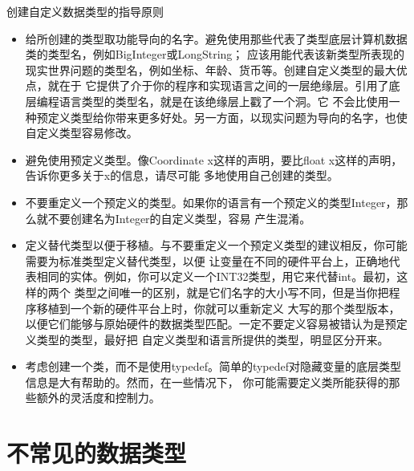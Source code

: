 \documentclass{article}
\begin{document}
\par
创建自定义数据类型的指导原则
\begin{itemize}
    \item 给所创建的类型取功能导向的名字。避免使用那些代表了类型底层计算机数据类的类型名，例如BigInteger或LongString；
    应该用能代表该新类型所表现的现实世界问题的类型名，例如坐标、年龄、货币等。创建自定义类型的最大优点，就在于
    它提供了介于你的程序和实现语言之间的一层绝缘层。引用了底层编程语言类型的类型名，就是在该绝缘层上戳了一个洞。它
    不会比使用一种预定义类型给你带来更多好处。另一方面，以现实问题为导向的名字，也使自定义类型容易修改。
    \item 避免使用预定义类型。像Coordinate x这样的声明，要比float x这样的声明，告诉你更多关于x的信息，请尽可能
    多地使用自己创建的类型。
    \item 不要重定义一个预定义的类型。如果你的语言有一个预定义的类型Integer，那么就不要创建名为Integer的自定义类型，容易
    产生混淆。
    \item 定义替代类型以便于移植。与不要重定义一个预定义类型的建议相反，你可能需要为标准类型定义替代类型，以便
    让变量在不同的硬件平台上，正确地代表相同的实体。例如，你可以定义一个INT32类型，用它来代替int。最初，这样的两个
    类型之间唯一的区别，就是它们名字的大小写不同，但是当你把程序移植到一个新的硬件平台上时，你就可以重新定义
    大写的那个类型版本，以便它们能够与原始硬件的数据类型匹配。一定不要定义容易被错认为是预定义类型的类型，最好把
    自定义类型和语言所提供的类型，明显区分开来。
    \item 考虑创建一个类，而不是使用typedef。简单的typedef对隐藏变量的底层类型信息是大有帮助的。然而，在一些情况下，
    你可能需要定义类所能获得的那些额外的灵活度和控制力。
\end{itemize}


\section{不常见的数据类型}
\end{document}
